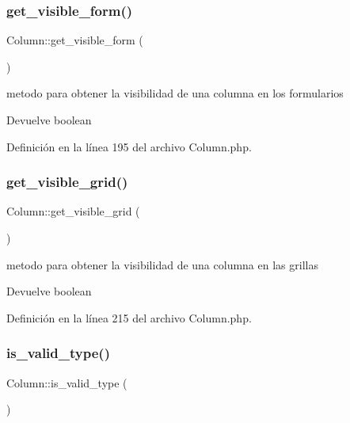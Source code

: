 \subsubsection{\texorpdfstring{get\_visible\_form()}{get\_visible\_form()}}
{\footnotesize\ttfamily Column\+::get\+\_\+visible\+\_\+form (\begin{DoxyParamCaption}{ }\end{DoxyParamCaption})}

metodo para obtener la visibilidad de una columna en los formularios

\begin{DoxyReturn}{Devuelve}
boolean 
\end{DoxyReturn}


Definición en la línea 195 del archivo Column.\+php.

\mbox{\label{class_column_a1ebf50eb00d5c65b0087cf13c1ceb8fd}} 
\subsubsection{\texorpdfstring{get\_visible\_grid()}{get\_visible\_grid()}}
{\footnotesize\ttfamily Column\+::get\+\_\+visible\+\_\+grid (\begin{DoxyParamCaption}{ }\end{DoxyParamCaption})}

metodo para obtener la visibilidad de una columna en las grillas

\begin{DoxyReturn}{Devuelve}
boolean 
\end{DoxyReturn}


Definición en la línea 215 del archivo Column.\+php.

\mbox{\label{class_column_a585cfab5cbfb826d564eeecd7fc462a7}} 
\subsubsection{\texorpdfstring{is\_valid\_type()}{is\_valid\_type()}}
{\footnotesize\ttfamily Column\+::is\+\_\+valid\+\_\+type (\begin{DoxyParamCaption}{ }\end{DoxyParamCaption})}

